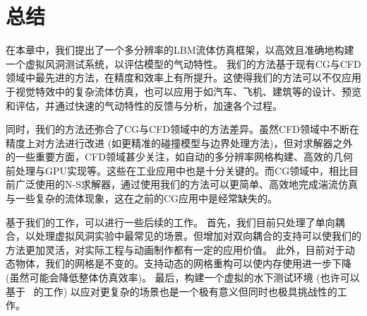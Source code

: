 \section{总结}
在本章中，我们提出了一个多分辨率的LBM流体仿真框架，以高效且准确地构建一个虚拟风洞测试系统，以评估模型的气动特性。
我们的方法基于现有CG与CFD领域中最先进的方法，在精度和效率上有所提升。这使得我们的方法可以不仅应用于视觉特效中的复杂流体仿真，也可以应用于如汽车、飞机、建筑等的设计、预览和评估，并通过快速的气动特性的反馈与分析，加速各个过程。

同时，我们的方法还弥合了CG与CFD领域中的方法差异。虽然CFD领域中不断在精度上对方法进行改进 (如更精准的碰撞模型与边界处理方法)，但对求解器之外的一些重要方面，CFD领域甚少关注，如自动的多分辨率网格构建、高效的几何前处理与GPU实现等。这些在工业应用中也是十分关键的。而CG领域中，相比目前广泛使用的N-S求解器，通过使用我们的方法可以更简单、高效地完成湍流仿真与一些复杂的流体现象，这在之前的CG应用中是经常缺失的。

基于我们的工作，可以进行一些后续的工作。
首先，我们目前只处理了单向耦合，以处理虚拟风洞实验中最常见的场景。但增加对双向耦合的支持可以使我们的方法更加灵活，对实际工程与动画制作都有一定的应用价值。
此外，目前对于动态物体，我们的网格是不变的。支持动态的网格重构可以使内存使用进一步下降 (虽然可能会降低整体仿真效率)。
最后，构建一个虚拟的水下测试环境 (也许可以基于~\cite{Wei:2022, Wei:2023} 的工作) 以应对更复杂的场景也是一个极有意义但同时也极具挑战性的工作。